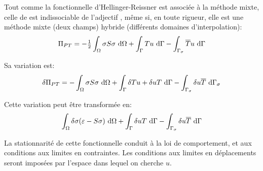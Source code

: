 \medskip
Tout comme la fonctionnelle d'Hellinger-Reissner est associé{}e à{}
la mé{}thode mixte, celle de 
 est indissociable
de l'adjectif , mê{}me si, en toute rigueur, elle est
une méthode mixte (deux champs) hybride (différents domaines
d'interpolation):
\begin{equation}
   \label{Eq:PiPT}
   \Pi_{PT} = -\tfrac12\displaystyle\int_\Omega \sigma S\sigma\ \text{d}\Omega
         +\displaystyle\int_{\Gamma} T u\ \text{d}\Gamma\\
         -\displaystyle\int_{\Gamma_\sigma} \overline{T} u\ \text{d}\Gamma
\end{equation}

\medskip
Sa variation est:
\begin{equation}
   \label{Eq:deltaPiPT}
   \delta\Pi_{PT} =
        -\displaystyle\int_{\Omega} \sigma S\sigma\ \text{d}\Omega
        +\displaystyle\int_{\Gamma} \delta Tu+\delta uT\ \text{d}\Gamma
        -\displaystyle\int_{\Gamma_\sigma} \delta u \overline{T}\ \text{d}\Gamma_\sigma
\end{equation}

\medskip
Cette variation peut ê{}tre transformé{}e en:
\[
   \displaystyle\int_\Omega \delta \sigma (\varepsilon- S\sigma) \ \text{d}\Omega
   +\displaystyle\int_{\Gamma} \delta uT\ \text{d}\Gamma
   -\displaystyle\int_{\Gamma_\sigma} \delta u\overline{T}\ \text{d}\Gamma
\]

\medskip
La stationnarité{} de cette fonctionnelle conduit à{} la loi de
comportement, et aux conditions aux limites en contraintes. 
Les conditions aux limites en dé{}placements seront imposées par l'espace
dans lequel on cherche $u$.

